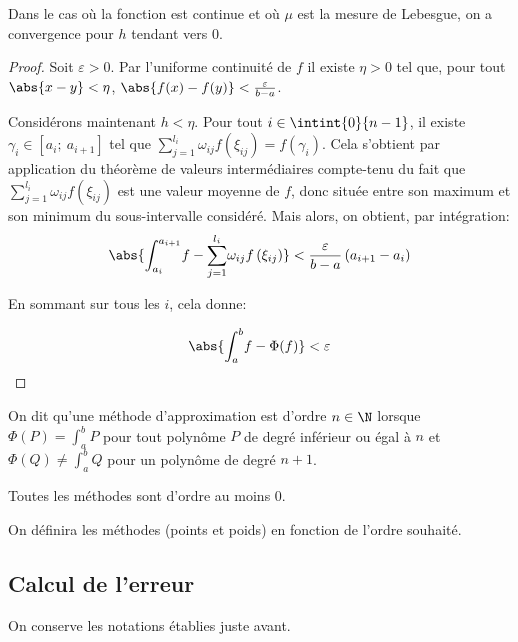 \begin{prop}
Dans le cas où la fonction est continue et où $\mu$ est la mesure de Lebesgue, on a convergence pour $h$ tendant vers $0$.
\end{prop}

\begin{proof}
Soit $\varepsilon>0$. Par l'uniforme continuité de $f$ il existe $\eta>0$ tel que, pour tout $\abs{x-y}<\eta$, $\abs{f(x)-f(y)} < \frac{\varepsilon}{b-a}$.

\medskip
Considérons maintenant $h < \eta$. Pour tout $i \in \intint{0}{n-1}$, il existe $\gamma_i \in [a_i;~a_{i+1}]$ tel que $\displaystyle{\sum_{j=1}^{l_i}} \omega_{ij} f\left ( \xi_{ij}\right ) = f(\gamma_i)$. Cela s'obtient par application du théorème de valeurs intermédiaires compte-tenu du fait que $\displaystyle{\sum_{j=1}^{l_i}} \omega_{ij} f\left ( \xi_{ij}\right )$ est une valeur moyenne de $f$, donc située entre son maximum et son minimum du sous-intervalle considéré. Mais alors, on obtient, par intégration:
\[
\abs{\displaystyle{\int_{a_i}^{a_{i+1}}} f - \displaystyle{\sum_{j=1}^{l_i}} \omega_{ij} f\left ( \xi_{ij}\right )} < \dfrac{\varepsilon}{b-a} \, (a_{i+1}-a_i)
\]

En sommant sur tous les $i$, cela donne:

\[
\abs{\displaystyle{\int_{a}^{b}} f - \Phi(f)} < \varepsilon
\]
\end{proof}

\begin{de}
On dit qu'une méthode d'approximation est d'ordre $n \in \N$ lorsque $\Phi(P) = \displaystyle{\int_{a}^{b}} P$ pour tout polynôme $P$ de degré inférieur ou égal à $n$ et $\Phi(Q) \neq \displaystyle{\int_{a}^{b}} Q$ pour un polynôme de degré $n+1$.
\end{de}

\begin{listremarques}
\item
Toutes les méthodes sont d'ordre au moins $0$.
\item
On définira les méthodes (points et poids) en fonction de l'ordre souhaité.
\end{listremarques}


\subsection{Calcul de l'erreur}

On conserve les notations établies juste avant.

